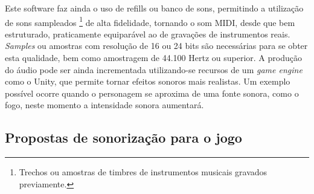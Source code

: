 Este software faz ainda o uso de refills ou banco de sons, permitindo a utilização de sons sampleados
\footnote{Trechos ou amostras de timbres de instrumentos musicais gravados previamente.}
 de alta fidelidade, tornando o som MIDI, desde que bem estruturado, praticamente equiparável ao de gravações de instrumentos reais. \textit{Samples} ou amostras com resolução de 16 ou 24 bits são necessárias para se obter esta qualidade, bem como amostragem de 44.100 Hertz ou superior. A produção do áudio pode ser ainda incrementada utilizando-se recursos de um \textit{game engine} como o Unity, que permite tornar efeitos sonoros mais realistas. Um exemplo possível ocorre quando o personagem se aproxima de uma fonte sonora, como o fogo, neste momento a intensidade sonora aumentará.

\subsection{Propostas de sonorização para o jogo}

